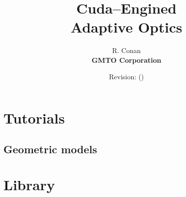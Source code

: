 \documentclass[oldfontcommands]{memoir}
\begin{document}
\title{\Huge {\HUGE\bf C}uda--{\HUGE\bf E}ngined\\Adaptive {\HUGE\bf O}ptics}
\author{R. Conan\\\bf GMTO Corporation}
\date{Revision\gitVtags\gitReferences: \gitAbbrevHash{} (\gitAuthorDate)}

\maketitle
\newpage
\tableofcontents

\part{Tutorials}
\chapter{Geometric models}


\part{Library}



%


\printindex
\end{document}
